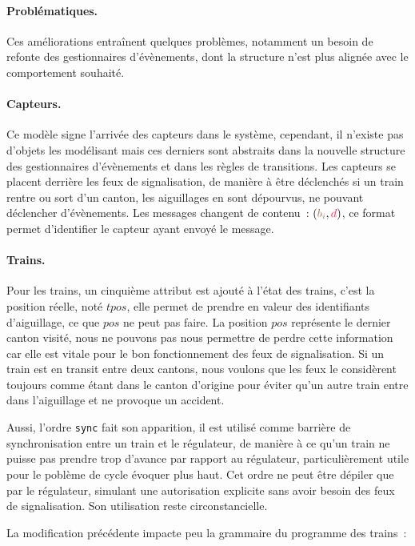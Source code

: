 \documentclass[oneside, a4paper, 11pt]{book}
\newcommand{\dirFmt}[1]{{\color{dircolor} #1}}
\newcommand{\posFmt}[1]{{\color{poscolor}{#1}}}
\newcommand{\bid}[1]{\ensuremath{\posFmt{b_{#1}}}}
\begin{document}
\paragraph{Problématiques.} Ces améliorations entraînent quelques problèmes, notamment un besoin de refonte des gestionnaires d'évènements, dont la structure n'est plus alignée avec le comportement souhaité. 

\paragraph{Capteurs.} Ce modèle signe l'arrivée des capteurs dans le système, cependant, il n'existe pas d'objets les modélisant mais ces derniers sont abstraits dans la nouvelle structure des gestionnaires d'évènements et dans les règles de transitions.
Les capteurs se placent derrière les feux de signalisation, de manière à être déclenchés si un train rentre ou sort d'un canton, les aiguillages en sont dépourvus, ne pouvant déclencher d'évènements. Les messages changent de contenu~: $(\bid{i},\dirFmt{d})$, ce format permet d'identifier le capteur ayant envoyé le message.

\paragraph{Trains.} Pour les trains, un cinquième attribut est ajouté à l'état des trains, c'est la position réelle, noté $tpos$, elle permet de prendre en valeur des identifiants d'aiguillage, ce que $pos$ ne peut pas faire.
La position $pos$ représente le dernier canton visité, nous ne pouvons pas nous permettre de perdre cette information car elle est vitale pour le bon fonctionnement des feux de signalisation. Si un train est en transit entre deux cantons, nous voulons que les feux le considèrent toujours comme étant dans le canton d'origine pour éviter qu'un autre train entre dans l'aiguillage et ne provoque un accident.

Aussi, l'ordre \texttt{sync} fait son apparition, il est utilisé comme barrière de synchronisation entre un train et le régulateur, de manière à ce qu'un train ne puisse pas prendre trop d'avance par rapport au régulateur, particulièrement utile pour le poblème de cycle évoquer plus haut. Cet ordre ne peut être dépiler que par le régulateur, simulant une autorisation explicite sans avoir besoin des feux de signalisation.
Son utilisation reste circonstancielle.

\begin{sidebox}
		La modification précédente impacte peu la grammaire du programme des trains~:
	\vspace{0.3cm}\\
	\begin{grammar}
	\end{grammar}
\end{sidebox}
\end{document}
